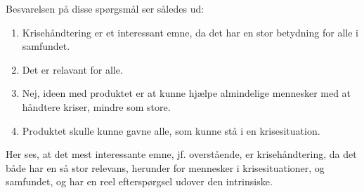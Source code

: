 \vspace{1em}

Besvarelsen på disse spørgsmål ser således ud:
\begin{enumerate}
    \item Krisehåndtering er et interessant emne, da det har en stor betydning for alle i samfundet.
    \item Det er relavant for alle.
    \item Nej, ideen med produktet er at kunne hjælpe almindelige mennesker med at håndtere kriser, mindre som store.
    \item Produktet skulle kunne gavne alle, som kunne stå i en krisesituation.
\end{enumerate}

Her ses, at det mest interessante emne, jf. overstående, er krisehåndtering, da det både har en så stor relevans, herunder for mennesker i krisesituationer, og samfundet, og har en reel efterspørgsel udover den intrinsiske.